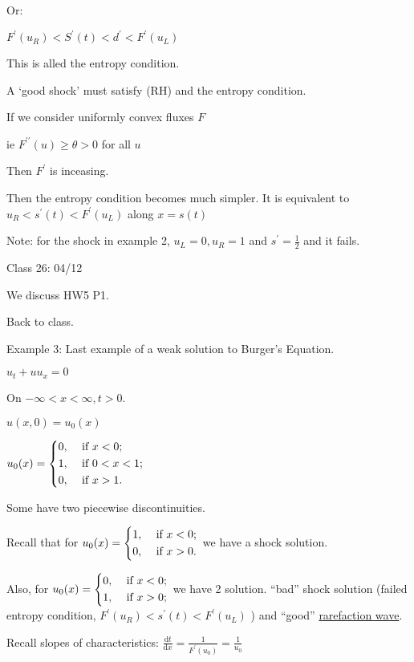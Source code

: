\documentclass{article}
\theoremstyle{definition}
\begin{document}
Or:

\(F^{\prime} (u_R) < S^{\prime} (t) < d^{\prime} < F^{\prime} (u_L)\) 

This is alled the entropy condition.

A `good shock' must satisfy (RH) and the entropy condition.

If we consider uniformly convex fluxes \(F\)

ie \(F^{\prime\prime}(u) \geq \theta >0\) for all \(u\) 

Then \(F^{\prime}\) is inceasing.

Then the entropy condition becomes much simpler. It is equivalent to \(u_R < s^{\prime}(t)<F^{\prime}(u_L)\) along \(x=s(t)\) 

Note: for the shock in example 2, \(u_L=0, u_R=1\) and \(s^{\prime} = \frac{1}{2}\) and it fails. 

\hrulefill

Class 26: 04/12

We discuss HW5 P1.

Back to class.

Example 3: Last example of a weak solution to Burger's Equation.

\(u_t + u u _x = 0\) 

On \(-\infty < x < \infty , t > 0\).

\(u(x,0)=u_0(x)\) 

\(u_0(x) = \begin{dcases}
    0, &\text{ if } x < 0 ;\\
    1, &\text{ if } 0 < x < 1 ;\\
    0, &\text{ if } x > 1 .
\end{dcases}\) 

Some have two piecewise discontinuities.

Recall that for \(u_0(x)=\begin{dcases}
    1, &\text{ if } x < 0 ;\\
    0, &\text{ if } x > 0 .
\end{dcases}\)  we have a shock solution.

Also, for \(u_0(x)=\begin{dcases}
    0, &\text{ if } x < 0 ;\\
    1, &\text{ if } x > 0 ;
\end{dcases}\) we have 2 solution. ``bad'' shock solution (failed entropy condition, \(F^{\prime} (u_R) < s^{\prime} (t) < F^{\prime} (u_L)\) ) and ``good'' \underline{rarefaction wave}.

Recall slopes of characteristics: \(\frac{\mathrm{d}t}{\mathrm{d}x} = \frac{1}{F^{\prime} (u_0)} = \frac{1}{u_0}\)
\end{document}
